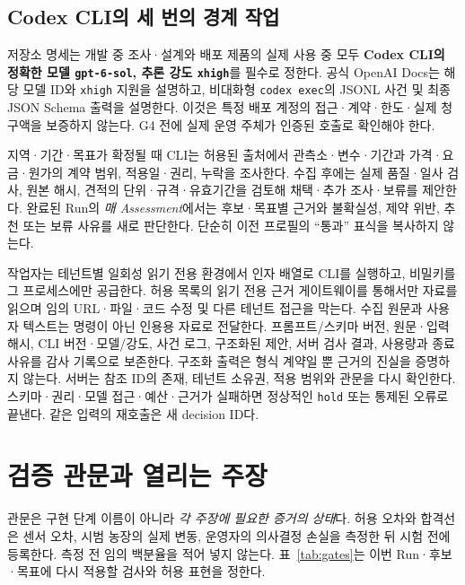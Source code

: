 \documentclass[11pt,a4paper]{article}
\begin{document}
\subsection{Codex CLI의 세 번의 경계 작업}
저장소 명세는 개발 중 조사·설계와 배포 제품의 실제 사용 중 모두 \textbf{Codex CLI의 정확한 모델 \texttt{gpt-6-sol}, 추론 강도 \texttt{xhigh}}를 필수로 정한다. 공식 OpenAI Docs는 해당 모델 ID와 \texttt{xhigh} 지원을 설명하고, 비대화형 \texttt{codex exec}의 JSONL 사건 및 최종 JSON Schema 출력을 설명한다\cite{openai-model,openai-exec}. 이것은 특정 배포 계정의 접근·계약·한도·실제 청구액을 보증하지 않는다. G4 전에 실제 운영 주체가 인증된 호출로 확인해야 한다.

지역·기간·목표가 확정될 때 CLI는 허용된 출처에서 관측소·변수·기간과 가격·요금·원가의 계약 범위, 적용일·권리, 누락을 조사한다. 수집 후에는 실제 품질·일사 검사, 원본 해시, 견적의 단위·규격·유효기간을 검토해 채택·추가 조사·보류를 제안한다. 완료된 Run의 \emph{매 Assessment}에서는 후보·목표별 근거와 불확실성, 제약 위반, 추천 또는 보류 사유를 새로 판단한다. 단순히 이전 프로필의 ``통과'' 표식을 복사하지 않는다.

작업자는 테넌트별 일회성 읽기 전용 환경에서 인자 배열로 CLI를 실행하고, 비밀키를 그 프로세스에만 공급한다. 허용 목록의 읽기 전용 근거 게이트웨이를 통해서만 자료를 읽으며 임의 URL·파일·코드 수정 및 다른 테넌트 접근을 막는다. 수집 원문과 사용자 텍스트는 명령이 아닌 인용용 자료로 전달한다. 프롬프트/스키마 버전, 원문·입력 해시, CLI 버전·모델/강도, 사건 로그, 구조화된 제안, 서버 검사 결과, 사용량과 종료 사유를 감사 기록으로 보존한다. 구조화 출력은 형식 계약일 뿐 근거의 진실을 증명하지 않는다. 서버는 참조 ID의 존재, 테넌트 소유권, 적용 범위와 관문을 다시 확인한다. 스키마·권리·모델 접근·예산·근거가 실패하면 정상적인 \texttt{hold} 또는 통제된 오류로 끝낸다. 같은 입력의 재호출은 새 decision ID다.

\section{검증 관문과 열리는 주장}
관문은 구현 단계 이름이 아니라 \emph{각 주장에 필요한 증거의 상태}다. 허용 오차와 합격선은 센서 오차, 시범 농장의 실제 변동, 운영자의 의사결정 손실을 측정한 뒤 시험 전에 등록한다. 측정 전 임의 백분율을 적어 넣지 않는다. 표~\ref{tab:gates}는 이번 Run·후보·목표에 다시 적용할 검사와 허용 표현을 정한다.
\end{document}
